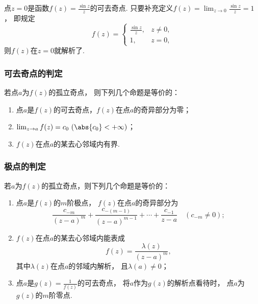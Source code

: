 \begin{example}
点\(z=0\)是函数\(f(z) = \frac{\sin z}{z}\)的可去奇点.
只要补充定义\(f(z) = \lim_{z\to0} \frac{\sin z}{z} = 1\)，
即规定\begin{equation*}
	f(z) = \left\{ \begin{array}{cc}
		\frac{\sin z}{z}, & z\neq0, \\
		1, & z=0,
	\end{array} \right.
\end{equation*}
则\(f(z)\)在\(z=0\)就解析了.
\end{example}

\subsubsection{可去奇点的判定}
\begin{theorem}\label{theorem:解析函数的级数表示.可去奇点的特征}
若点\(a\)为\(f(z)\)的孤立奇点，
则下列几个命题是等价的：
\begin{enumerate}
	\item 点\(a\)是\(f(z)\)的可去奇点，\(f(z)\)在点\(a\)的奇异部分为零；
	\item \(\lim_{z \to a} f(z) = c_0\ (\abs{c_0} < +\infty)\)；
	\item \(f(z)\)在点\(a\)的某去心邻域内有界.
\end{enumerate}
\end{theorem}

\subsubsection{极点的判定}
\begin{theorem}\label{theorem:解析函数的级数表示.极点的特征}
若\(a\)为\(f(z)\)的孤立奇点，则下列几个命题是等价的：
\begin{enumerate}
	\item 点\(a\)是\(f(z)\)的\(m\)阶极点，
	\(f(z)\)在点\(a\)的奇异部分为\begin{equation*}
		\frac{c_{-m}}{(z-a)^m}
		+ \frac{c_{-(m-1)}}{(z-a)^{m-1}}
		+ \dotsb + \frac{c_{-1}}{z-a}
		\quad(c_{-m}\neq0);
	\end{equation*}

	\item \(f(z)\)在点\(a\)的某去心邻域内能表成\begin{equation*}
		f(z) = \frac{\lambda(z)}{(z-a)^m},
	\end{equation*}
	其中\(\lambda(z)\)在点\(a\)的邻域内解析，
	且\(\lambda(a)\neq0\)；

	\item 点\(a\)是\(g(z) = \frac{1}{f(z)}\)的可去奇点，
	将\(a\)作为\(g(z)\)的解析点看待时，
	点\(a\)为\(g(z)\)的\(m\)阶零点.
\end{enumerate}
\end{theorem}

